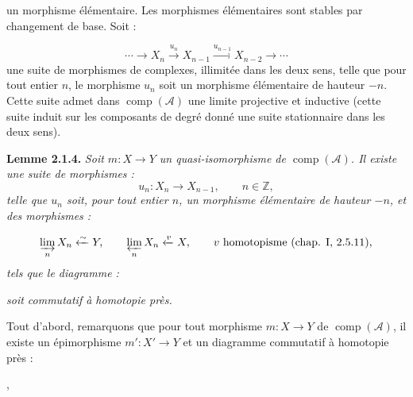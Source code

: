 \clearpage
{}%
\begingroup\small\setlength{\parskip}{0pt}\setlength{\emergencystretch}{1.5em}
\setlength{\abovedisplayskip}{4pt plus 2pt minus 2pt}%
\setlength{\belowdisplayskip}{4pt plus 2pt minus 2pt}%

un morphisme élémentaire. Les morphismes élémentaires sont stables par
changement de base. Soit :

\[
\cdots\longrightarrow X_n\xrightarrow{u_n}X_{n-1}
\xrightarrow{u_{n-1}}X_{n-2}\longrightarrow\cdots
\]
une suite de morphismes de complexes, illimitée dans les deux sens, telle
que pour tout entier $n$, le morphisme $u_n$ soit un morphisme élémentaire
de hauteur $-n$. Cette suite admet dans
$\operatorname{comp}(\mathcal A)$ une limite projective et inductive (cette
suite induit sur les composants de degré donné une suite stationnaire dans
les deux sens).

\medskip\noindent\textbf{Lemme 2.1.4.}\quad
\textit{Soit $m\colon X\longrightarrow Y$ un quasi-isomorphisme de
$\operatorname{comp}(\mathcal A)$. Il existe une suite de morphismes :}
\[
u_n\colon X_n\longrightarrow X_{n-1},\qquad n\in\mathbb Z,
\]
\noindent\textit{telle que $u_n$ soit, pour tout entier $n$, un morphisme
élémentaire de hauteur $-n$, et des morphismes :}

\[
\varinjlim_n X_n\xleftarrow{\sim}Y,
\qquad
\varprojlim_n X_n\xleftarrow{v}X,
\qquad v\text{ homotopisme (chap. I, 2.5.11)},
\]
\noindent\textit{tels que le diagramme :}

\begin{center}
\end{center}
\noindent\textit{soit commutatif à homotopie près.}

Tout d'abord, remarquons que pour tout morphisme
$m\colon X\longrightarrow Y$ de $\operatorname{comp}(\mathcal A)$, il existe
un épimorphisme $m'\colon X'\longrightarrow Y$ et un diagramme commutatif à
homotopie près :

\begin{center}
\qquad,
\end{center}
\endgroup
